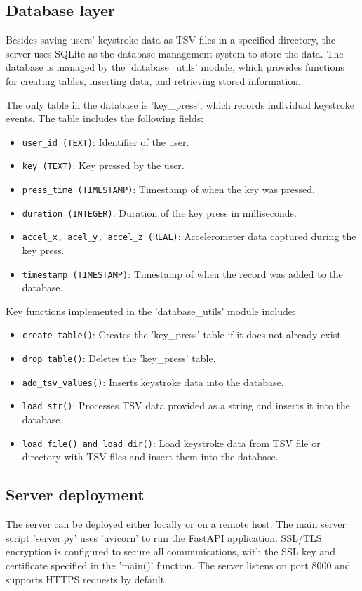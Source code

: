 \subsection{Database layer}
Besides saving users' keystroke data as TSV files in a specified directory, the server uses SQLite as the database management system to store the data. The database is managed by the 'database\_utils' module, which provides functions for creating tables, inserting data, and retrieving stored information.

The only table in the database is 'key\_press', which records individual keystroke events. The table includes the following fields:
\begin{itemize}
    \item \texttt{user\_id (TEXT)}: Identifier of the user.
    \item \texttt{key (TEXT)}: Key pressed by the user.
    \item \texttt{press\_time (TIMESTAMP)}: Timestamp of when the key was pressed.
    \item \texttt{duration (INTEGER)}: Duration of the key press in milliseconds.
    \item \texttt{accel\_x, acel\_y, accel\_z (REAL)}: Accelerometer data captured during the key press.
    \item \texttt{timestamp (TIMESTAMP)}: Timestamp of when the record was added to the database.
\end{itemize}
Key functions implemented in the 'database\_utils' module include:
\begin{itemize}
    \item \texttt{create\_table()}: Creates the 'key\_press' table if it does not already exist.
    \item \texttt{drop\_table()}: Deletes the 'key\_press' table.
    \item \texttt{add\_tsv\_values()}: Inserts keystroke data into the database.
    \item \texttt{load\_str()}: Processes TSV data provided as a string and inserts it into the database.
    \item \texttt{load\_file() and load\_dir()}: Load keystroke data from TSV file or directory with TSV files and insert them into the database.
\end{itemize}

\subsection{Server deployment}
The server can be deployed either locally or on a remote host. The main server script 'server.py' uses 'uvicorn' to run the FastAPI application. SSL/TLS encryption is configured to secure all communications, with the SSL key and certificate specified in the 'main()' function. The server listens on port 8000 and supports HTTPS requests by default.